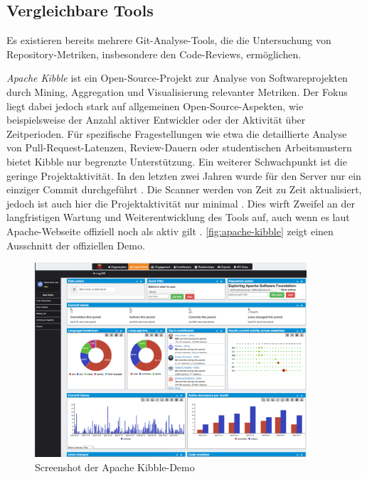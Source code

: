 \subsection{Vergleichbare Tools}
Es existieren bereits mehrere Git-Analyse-Tools, die die Untersuchung von Repository-Metriken, insbesondere den Code-Reviews, ermöglichen. 

\textit{Apache Kibble} ist ein Open-Source-Projekt zur Analyse von Softwareprojekten durch Mining, Aggregation und Visualisierung relevanter Metriken. Der Fokus liegt dabei jedoch stark auf allgemeinen Open-Source-Aspekten, wie beispielsweise der Anzahl aktiver Entwickler oder der Aktivität über Zeitperioden. Für spezifische Fragestellungen wie etwa die detaillierte Analyse von Pull-Request-Latenzen, Review-Dauern oder studentischen Arbeitsmustern bietet Kibble nur begrenzte Unterstützung. Ein weiterer Schwachpunkt ist die geringe Projektaktivität. In den letzten zwei Jahren wurde für den Server nur ein einziger Commit durchgeführt \parencite{noauthor_apachekibble-1_2025}. Die Scanner werden von Zeit zu Zeit aktualisiert, jedoch ist auch hier die Projektaktivität nur minimal \parencite{noauthor_apachekibble-scanners_2024}. Dies wirft Zweifel an der langfristigen Wartung und Weiterentwicklung des Tools auf, auch wenn es laut Apache-Webseite offiziell noch als aktiv gilt \parencite{noauthor_apache_nodate}. \autoref{fig:apache-kibble} zeigt einen Ausschnitt der offiziellen Demo. \parencite{sally_apache_2018} \parencite{noauthor_setting_nodate}
\begin{figure}[htbp]
    \centering
    \includegraphics[width=0.9\textwidth]{Figures/apache-kibble.png}
    \caption{Screenshot der Apache Kibble-Demo \parencite{noauthor_code_nodate}}
    \label{fig:apache-kibble}
\end{figure}

